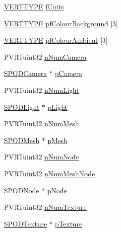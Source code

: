 \begin{DoxyCompactItemize}
\item 
\hyperlink{group___a_p_i___o_g_l_e_s_ga06da457b7d3e93368ab904f89e1396be}{V\+E\+R\+T\+T\+Y\+P\+E} \hyperlink{struct_s_p_o_d_scene_a56ec6b8edeed418236ba15b41e63d71b}{f\+Units}
\item 
\hyperlink{group___a_p_i___o_g_l_e_s_ga06da457b7d3e93368ab904f89e1396be}{V\+E\+R\+T\+T\+Y\+P\+E} \hyperlink{struct_s_p_o_d_scene_addc6ec3a2b915a5bb9ade25a90d26e0d}{pf\+Colour\+Background} \mbox{[}3\mbox{]}
\item 
\hyperlink{group___a_p_i___o_g_l_e_s_ga06da457b7d3e93368ab904f89e1396be}{V\+E\+R\+T\+T\+Y\+P\+E} \hyperlink{struct_s_p_o_d_scene_a7f984cbf6de8f86351f7fd8fa428183d}{pf\+Colour\+Ambient} \mbox{[}3\mbox{]}
\item 
P\+V\+R\+Tuint32 \hyperlink{struct_s_p_o_d_scene_a05ca43d0015cfbc54c8b08e3fc841de7}{n\+Num\+Camera}
\item 
\hyperlink{struct_s_p_o_d_camera}{S\+P\+O\+D\+Camera} $\ast$ \hyperlink{struct_s_p_o_d_scene_a90c0c8d37cb1cd44a5e7ac6be0b2854b}{p\+Camera}
\item 
P\+V\+R\+Tuint32 \hyperlink{struct_s_p_o_d_scene_a1e96379dedf00f0f40e228bfb6134ed9}{n\+Num\+Light}
\item 
\hyperlink{struct_s_p_o_d_light}{S\+P\+O\+D\+Light} $\ast$ \hyperlink{struct_s_p_o_d_scene_a75f48db326cc4c5e4b99f6be32078f58}{p\+Light}
\item 
P\+V\+R\+Tuint32 \hyperlink{struct_s_p_o_d_scene_afdcb771c7abf69fede83d561df34b1a7}{n\+Num\+Mesh}
\item 
\hyperlink{struct_s_p_o_d_mesh}{S\+P\+O\+D\+Mesh} $\ast$ \hyperlink{struct_s_p_o_d_scene_abe073dec205d6a8509443812ead74c8f}{p\+Mesh}
\item 
P\+V\+R\+Tuint32 \hyperlink{struct_s_p_o_d_scene_a983e12238e7b38a01b917a4c17e01d98}{n\+Num\+Node}
\item 
P\+V\+R\+Tuint32 \hyperlink{struct_s_p_o_d_scene_a777c67f414705f007f4cf0407b70cb55}{n\+Num\+Mesh\+Node}
\item 
\hyperlink{struct_s_p_o_d_node}{S\+P\+O\+D\+Node} $\ast$ \hyperlink{struct_s_p_o_d_scene_a00bcbd5609fe18b51c55b119b50e27ad}{p\+Node}
\item 
P\+V\+R\+Tuint32 \hyperlink{struct_s_p_o_d_scene_a1d46d56b22c0033b1e212f9dd2f529d9}{n\+Num\+Texture}
\item 
\hyperlink{struct_s_p_o_d_texture}{S\+P\+O\+D\+Texture} $\ast$ \hyperlink{struct_s_p_o_d_scene_aaa264e78f9007121bb279875eaafd2ad}{p\+Texture}
\item 

\end{DoxyCompactItemize}
